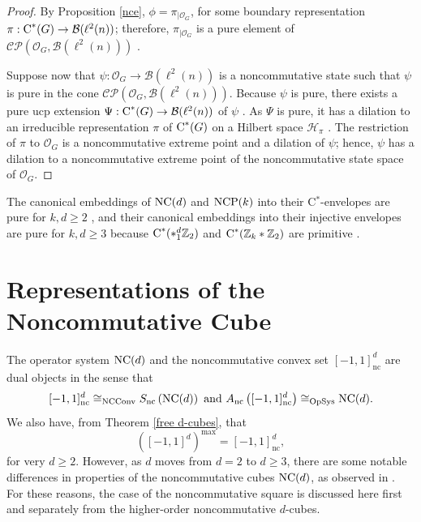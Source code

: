 \documentclass{amsart}
\theoremstyle{definition}
\theoremstyle{remark}
\newcommand{\B}{\mathcal{B}}
\renewcommand{\H}{\mathcal{H}}
\newcommand\cstar{{\textrm C}^*}                              %
\numberwithin{equation}{section}
\begin{document}
\begin{proof} By Proposition \ref{nce}, $\phi=\pi_{\vert \mathcal O_G}$, for some boundary representation 
$\pi:\cstar(G)\rightarrow  \B(\ell^2(n))$; therefore, $\pi_{\vert\mathcal O_G}$ is a pure element of 
$\mathcal C \mathcal P(\mathcal O_G,\B(\ell^2(n)))$ \cite[Proposition 2.12]{farenick--tessier2022}.

Suppose now that 
$\psi:\mathcal O_G\rightarrow\B(\ell^2(n))$ is a noncommutative state such that $\psi$ is pure in the cone $\mathcal C \mathcal P(\mathcal O_G,\B(\ell^2(n)))$.
Because $\psi$ is pure, there exists a pure ucp extension
$\Psi:\cstar(G)\rightarrow\B(\ell^2(n))$ of $\psi$ \cite[p.~180]{arveson1969}. 
As $\Psi$ is pure, it has a dilation to an irreducible representation $\pi$ of
$\cstar(G)$ on a Hilbert space $\H_\pi$ \cite[Corollary 1.4.3]{arveson1969}. 
The restriction of $\pi$ to $\mathcal O_G$ is a noncommutative extreme point and a dilation of $\psi$; hence,
$\psi$ has a dilation to a noncommutative extreme point of the noncommutative state space of $\mathcal O_G$.
\end{proof} 

The canonical embeddings of $\mbox{\textrm{NC}}(d)$ and $\mbox{\textrm{NCP}}(k)$ into their C$^*$-envelopes are pure for $k,d\geq 2$ 
\cite[Theorem 4.3]{farenick--tessier2022}, and their canonical embeddings into their injective envelopes are pure for  $k,d\geq3$
\cite[Theorem 3.2]{farenick--tessier2022} because 
$\cstar(*_1^d\mathbb Z_2)$ and $\cstar(\mathbb Z_k*\mathbb Z_2)$ are primitive \cite[Corollary 3.4]{bedos_omland2011}.

\section{Representations of the Noncommutative Cube}

The operator system $\mbox{\textrm{NC}}(d)$ and the noncommutative convex set 
$[-1,1]^d_{\textrm{nc}}$ are dual objects in the sense that
\[
[-1,1]^d_{\textrm{nc}} \cong_{{\textrm{NCConv}}} S_{\textrm{nc}}\left( \mbox{\textrm{NC}}(d)\right) \mbox{ and }
A_{\textrm{nc}}\left([-1,1]^d_{\textrm{nc}}\right)\cong_{{\textrm{OpSys}}}   \mbox{\textrm{NC}}(d) .
\]
We also have, from Theorem \ref{free d-cubes}, that
\[
\left([-1,1]^d\right)^{\textrm{max}}=[-1,1]^d_{\textrm{nc}} ,
\]
for very $d\geq 2$. However,
as $d$ moves from $d=2$ to $d\geq3$, there are some notable differences in properties of the noncommutative 
cubes $\mbox{\textrm{NC}}(d)$, as observed in 
\cite{farenick--kavruk--paulsen--todorov2014,farenick--kavruk--paulsen--todorov2018}. 
For these reasons, the case of the noncommutative square is
discussed here first and separately from the higher-order noncommutative
$d$-cubes.
\end{document}
